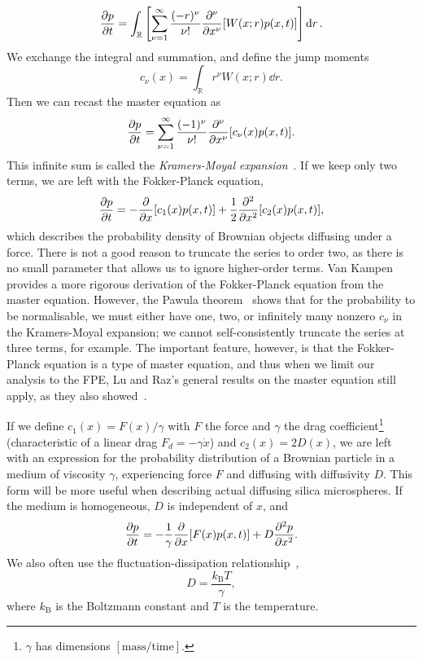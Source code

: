 \documentclass[hyperref={colorlinks=true, urlcolor=blue, citecolor=blue, final, bound}]{sfuthesis}
\newcommand{\kB}{k_{\mathrm{B}}}
\begin{document}
\begin{equation}
    \pdv{p}{t} = \int_{\mathbb R}\left[ \sum_{\nu=1}^\infty \frac{(-r)^\nu}{\nu!}\pdv[\nu]{x}[W(x;r)p(x,t)] \right]\dd{r}.
\end{equation}
We exchange the integral and summation, and define the jump moments 
\begin{equation}
    c_\nu(x) = \int_{\mathbb R} r^\nu W(x;r)\dd{r}.
\end{equation}
Then we can recast the master equation as
\begin{equation}
    \pdv{p}{t} = \sum_{\nu=1}^\infty \frac{(-1)^\nu}{\nu!}\pdv[\nu]{x}[c_\nu(x)p(x,t)].
\end{equation}
This infinite sum is called the \textit{Kramers-Moyal expansion}~\cite{vanKampen2011}. If we keep only two terms, we are left with the Fokker-Planck equation,
\begin{equation}
    \pdv{p}{t} = -\pdv{x}[c_1(x)p(x,t)] + \frac 12\pdv[2]{x}[c_2(x)p(x,t)],
\end{equation}
which describes the probability density of Brownian objects diffusing under a force. There is not a good reason to truncate the series to order two, as there is no small parameter that allows us to ignore higher-order terms. Van Kampen~\cite{vanKampen2011} provides a more rigorous derivation of the Fokker-Planck equation from the master equation. However, the Pawula theorem~\cite{Pawula1967} shows that for the probability to be normalisable, we must either have one, two, or infinitely many nonzero $c_\nu$ in the Kramers-Moyal expansion; we cannot self-consistently truncate the series at three terms, for example. The important feature, however, is that the Fokker-Planck equation is a type of master equation, and thus when we limit our analysis to the FPE, Lu and Raz's general results on the master equation still apply, as they also showed~\cite{Lu2017}.

If we define $c_1(x)=F(x)/\gamma$ with $F$ the force and $\gamma$ the drag coefficient\footnote{$\gamma$ has dimensions $\mathrm{[mass/time]}$.} (characteristic of a linear drag $F_d = -\gamma \dot x$) and $c_2(x)= 2D(x)$, we are left with an expression for the probability distribution of a Brownian particle in a medium of viscosity $\gamma$, experiencing force $F$ and diffusing with diffusivity $D$. This form will be more useful when describing actual diffusing silica microspheres. If the medium is homogeneous, $D$ is independent of $x$, and
\begin{equation}
    \pdv{p}{t} = -\frac 1{\gamma}\pdv{x}[F(x)p(x,t)]+D\pdv[2]{p}{x}.\label{eq:FPE}
\end{equation}
We also often use the fluctuation-dissipation relationship~\cite{vanKampen2011},
\begin{equation}
    D = \frac{\kB T}{\gamma},\label{eq:fluctuationDissipation}
\end{equation}
where $\kB $ is the Boltzmann constant and $T$ is the temperature. 
\end{document}
